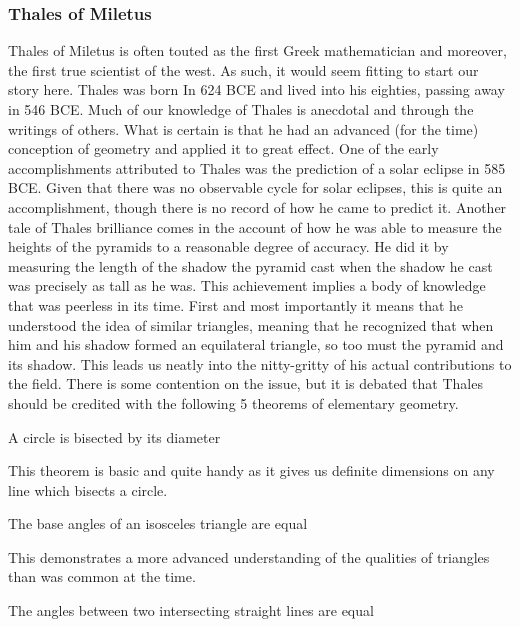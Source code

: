 \subsubsection{Thales of Miletus}
Thales of Miletus is often touted as the first Greek mathematician and moreover, the first
true scientist of the west. As such, it would seem fitting to start our story here. Thales was born In
624 BCE and lived into his eighties, passing away in 546 BCE. Much of our knowledge of Thales
is anecdotal and through the writings of others. What is certain is that he had an advanced (for the
time) conception of geometry and applied it to great effect. One of the early accomplishments
attributed to Thales was the prediction of a solar eclipse in 585 BCE. Given that there was no
observable cycle for solar eclipses, this is quite an accomplishment, though there is no record of
how he came to predict it. Another tale of Thales brilliance comes in the account of how he was able to measure
the heights of the pyramids to a reasonable degree of accuracy. He did it by measuring the length
of the shadow the pyramid cast when the shadow he cast was precisely as tall as he was.
This achievement implies a body of knowledge that was peerless in its time. First and most importantly
it means that he understood the idea of similar triangles, meaning that he recognized that when
him and his shadow formed an equilateral triangle, so too must the pyramid and its shadow.
This leads us neatly into the nitty-gritty of his actual contributions to the field. There is some contention
on the issue, but it is debated that Thales should be credited with the following 5 theorems of
elementary geometry.

\begin{theorem}
A circle is bisected by its diameter
\end{theorem}

This theorem is basic and quite handy as it gives us definite dimensions on any line which bisects a circle.

\begin{theorem}
The base angles of an isosceles triangle are equal
\end{theorem}

This demonstrates a more advanced understanding of the qualities of triangles than was common at the time.

\begin{theorem}
The angles between two intersecting straight lines are equal
\end{theorem}

